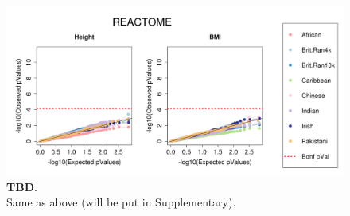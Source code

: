 \documentclass[12pt, a4paper]{article}
\begin{document}
\begin{figure}[htbp]
\centering
\includegraphics[scale=.35]{Images/Supp/InterPath_Supp_Figure_QQPlots_REACTOME_vs1.png}
\caption[TBD]{\textbf{TBD}. \\ Same as above (will be put in Supplementary).}
\label{InterPath-Suppl-Figure-QQPlots-REACTOME}
\end{figure}

\end{document}
